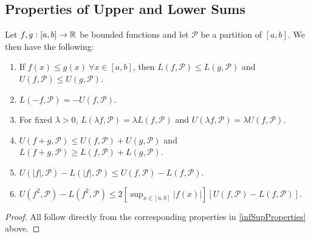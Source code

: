 \documentclass[../main.tex]{subfiles}
\begin{document}
\subsection{Properties of Upper and Lower Sums}
\begin{lemma}
  Let $f, g: [a, b] \to \mathbb{R}$ be bounded functions and let $\mathcal{P}$ be a partition of $[a, b]$.
  We then have the following: \label{upperLowerProperties}
  \begin{enumerate}
    \item If $f(x) \leq g(x)\ \forall x \in [a, b]$, then $L(f, \mathcal{P}) \leq L(g, \mathcal{P})$ and $U(f, \mathcal{P}) \leq U(g, \mathcal{P})$.
    \item $L(-f, \mathcal{P}) = -U(f, \mathcal{P})$.
    \item For fixed $\lambda > 0$, $L(\lambda f, \mathcal{P}) = \lambda L(f, \mathcal{P})$ and $U(\lambda f, \mathcal{P}) = \lambda U(f, \mathcal{P})$.
    \item $U(f + g, \mathcal{P}) \leq U(f, \mathcal{P}) + U(g, \mathcal{P})$ and $L(f + g, \mathcal{P}) \geq L(f, \mathcal{P}) + L(g, \mathcal{P})$.
    \item $U(|f|, \mathcal{P}) - L(|f|, \mathcal{P}) \leq U(f, \mathcal{P}) - L(f, \mathcal{P})$.
    \item $U(f^2, \mathcal{P}) - L(f^2, \mathcal{P}) \leq 2[\sup_{x \in [a, b]} |f(x)|][U(f, \mathcal{P}) - L(f, \mathcal{P})]$.
  \end{enumerate}
\end{lemma}
\begin{proof}
  All follow directly from the corresponding properties in \cref{infSupProperties} above.
\end{proof}
\end{document}
